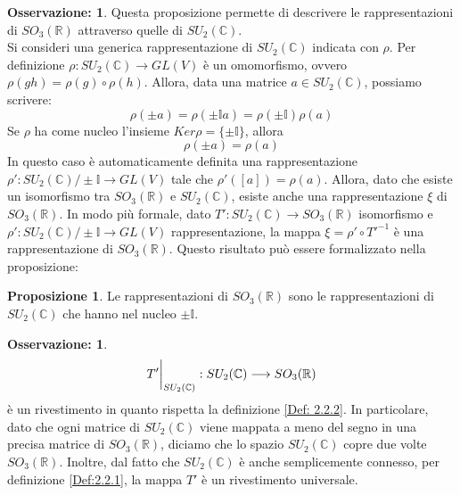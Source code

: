 \documentclass[12pt,a4paper]{report}
\theoremstyle{definition}
\theoremstyle{Theorem}
\newtheorem{Prop}[Def]{Proposizione}
\theoremstyle{definition}
\theoremstyle{definition}
\theoremstyle{definition}
\newtheorem{Obs}[Def]{Osservazione:}
\begin{document}
\begin{Obs} \label{Obs:3.5.1}
	Questa proposizione permette di descrivere le rappresentazioni di $SO_3(\mathbb{R})$ attraverso quelle di $SU_2(\mathbb{C})$. \\
	Si consideri una generica rappresentazione di $SU_2(\mathbb{C})$ indicata con $\rho$. Per definizione $\rho:SU_2(\mathbb{C})\rightarrow GL(V)$ è un omomorfismo, ovvero $\rho(gh)=\rho(g)\circ\rho(h)$. Allora, data una matrice $a\in SU_2(\mathbb{C})$, possiamo scrivere:
	$$\rho(\pm a)=\rho(\pm \mathbb{I}a)=\rho(\pm\mathbb{I})\rho(a)$$
	Se $\rho$ ha come nucleo l'insieme $Ker\rho=\{\pm\mathbb{I}\}$, allora
	$$\rho(\pm a)=\rho(a)$$
	In questo caso è automaticamente definita una rappresentazione $\rho':SU_2(\mathbb{C})/\pm\mathbb{I}\longrightarrow GL(V)$ tale che $\rho'([a])=\rho(a)$.
	Allora, dato che esiste un isomorfismo tra $SO_3(\mathbb{R})$ e $SU_2(\mathbb{C})$, esiste anche una rappresentazione $\xi$ di $SO_3(\mathbb{R})$. In modo più formale, dato $T':SU_2(\mathbb{C})\rightarrow SO_3(\mathbb{R})$ isomorfismo e $\rho':SU_2(\mathbb{C})/\pm\mathbb{I}\longrightarrow GL(V)$ rappresentazione, la mappa $\xi=\rho'\circ T'^{-1}$ è una rappresentazione di $SO_3(\mathbb{R})$.
	Questo risultato può essere formalizzato nella proposizione:
\end{Obs}
\begin{Prop}
	Le rappresentazioni di $SO_3(\mathbb{R})$ sono le rappresentazioni di $SU_2(\mathbb{C})$ che hanno nel nucleo $\pm\mathbb{I}$. 
\end{Prop}
\begin{Obs}
	 $$T'\bigg{\rvert}_{SU_2(\mathbb{C})}:SU_2(\mathbb{C})\longrightarrow SO_3(\mathbb{R})$$
	 è un rivestimento in quanto rispetta la definizione \ref{Def: 2.2.2}. In particolare, dato che ogni matrice di $SU_2(\mathbb{C})$ viene mappata a meno del segno in una precisa matrice di $SO_3(\mathbb{R})$, diciamo che lo spazio $SU_2(\mathbb{C})$ copre due volte $SO_3(\mathbb{R})$. Inoltre, dal fatto che $SU_2(\mathbb{C})$ è anche semplicemente connesso, per definizione \ref{Def:2.2.1}, la mappa $T'$ è un rivestimento universale.
\end{Obs}
\end{document}
